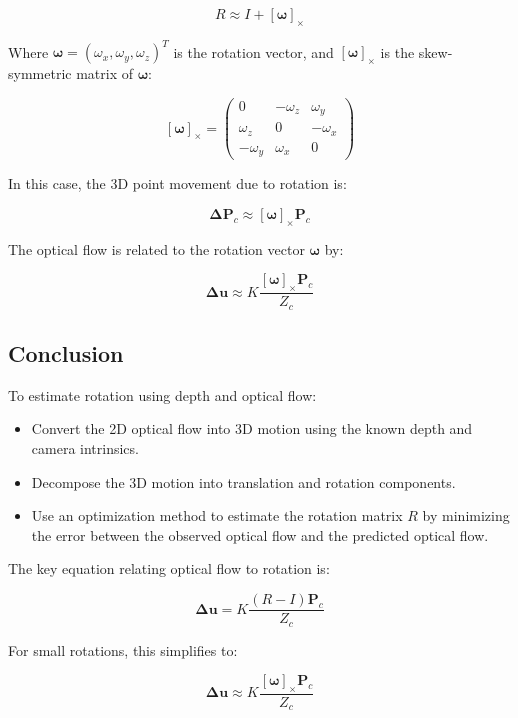 \[
R \approx I + [\mathbf{\omega}]_\times
\]

Where \( \mathbf{\omega} = (\omega_x, \omega_y, \omega_z)^T \) is the rotation vector, and \( [\mathbf{\omega}]_\times \) is the skew-symmetric matrix of \( \mathbf{\omega} \):

\[
[\mathbf{\omega}]_\times = \begin{pmatrix} 
	0 & -\omega_z & \omega_y \\
	\omega_z & 0 & -\omega_x \\
	-\omega_y & \omega_x & 0 
\end{pmatrix}
\]

In this case, the 3D point movement due to rotation is:

\[
\mathbf{\Delta P}_c \approx [\mathbf{\omega}]_\times \mathbf{P}_c
\]

The optical flow is related to the rotation vector \( \mathbf{\omega} \) by:

\[
\mathbf{\Delta u} \approx K \frac{[\mathbf{\omega}]_\times \mathbf{P}_c}{Z_c}
\]

\subsection{Conclusion}

To estimate rotation using depth and optical flow:
\begin{itemize}
	\item Convert the 2D optical flow into 3D motion using the known depth and camera intrinsics.
	\item Decompose the 3D motion into translation and rotation components.
	\item Use an optimization method to estimate the rotation matrix \( R \) by minimizing the error between the observed optical flow and the predicted optical flow.
\end{itemize}

The key equation relating optical flow to rotation is:

\[
\mathbf{\Delta u} = K \frac{(R - I) \mathbf{P}_c}{Z_c}
\]

For small rotations, this simplifies to:

\[
\mathbf{\Delta u} \approx K \frac{[\mathbf{\omega}]_\times \mathbf{P}_c}{Z_c}
\]



